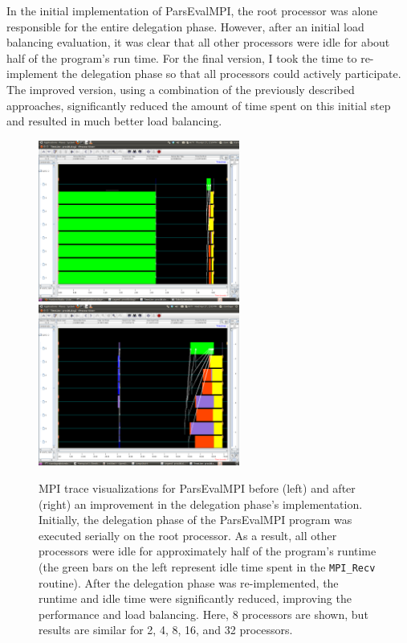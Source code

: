 \documentclass{bioinfo}
\begin{document}
\begin{methods}
In the initial implementation of ParsEvalMPI, the root processor was alone responsible for the entire delegation phase. However, after an initial load balancing evaluation, it was clear that all other processors were idle for about half of the program's run time. For the final version, I took the time to re-implement the delegation phase so that all processors could actively participate. The improved version, using a combination of the previously described approaches, significantly reduced the amount of time spent on this initial step and resulted in much better load balancing.

\begin{figure}
  \begin{center}
    \includegraphics[height=200px]{procs-08.png}
    \includegraphics[height=200px]{proc08-hg.png}
  \end{center}
  \caption{MPI trace visualizations for ParsEvalMPI before (left) and after (right) an improvement in the delegation phase's implementation. Initially, the delegation phase of the ParsEvalMPI program was executed serially on the root processor. As a result, all other processors were idle for approximately half of the program's runtime (the green bars on the left represent idle time spent in the \texttt{MPI\_Recv} routine). After the delegation phase was re-implemented, the runtime and idle time were significantly reduced, improving the performance and load balancing. Here, 8 processors are shown, but results are similar for 2, 4, 8, 16, and 32 processors.}
\end{figure}


\end{methods}
\end{document}
